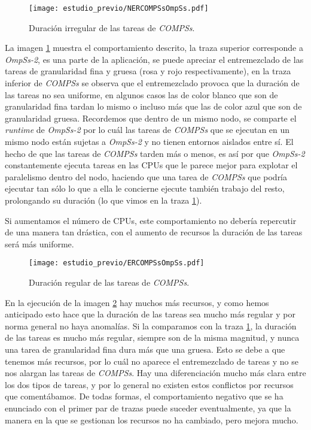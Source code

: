\begin{figure}[H]
	\centering 
	\caption{Duración irregular de las tareas de \textit{COMPSs}.}
	\texttt{[image: estudio\_previo/NERCOMPSsOmpSs.pdf]}
	\label{fig:irregular}
\end{figure}

La imagen \ref{fig:irregular} muestra el comportamiento descrito, la traza superior corresponde a \textit{OmpSs-2}, es una parte de la aplicación, se puede apreciar el entremezclado de las tareas de granularidad fina y gruesa (rosa y rojo respectivamente), en la traza inferior de \textit{COMPSs} se observa que el entremezclado provoca que la duración de las tareas no sea uniforme, en algunos casos las de color blanco que son de granularidad fina tardan lo mismo o incluso más que las de color azul que son de granularidad gruesa. Recordemos que dentro de un mismo nodo, se comparte el \textit{runtime} de \textit{OmpSs-2} por lo cuál las tareas de \textit{COMPSs} que se ejecutan en un mismo nodo están sujetas a \textit{OmpSs-2} y no tienen entornos aislados entre sí. El hecho de que las tareas de \textit{COMPSs} tarden más o menos, es así por que \textit{OmpSs-2} constantemente ejecuta tareas en las CPUs que le parece mejor para explotar el paralelismo dentro del nodo, haciendo que una tarea de \textit{COMPSs} que podría ejecutar tan sólo lo que a ella le concierne ejecute también trabajo del resto, prolongando su duración (lo que vimos en la traza \ref{fig:irregular}).

\par\bigskip

Si aumentamos el número de CPUs, este comportamiento no debería repercutir de una manera tan drástica, con el aumento de recursos la duración de las tareas será más uniforme.

\begin{figure}[H]
	\centering 
	\caption{Duración regular de las tareas de \textit{COMPSs}.}
	\texttt{[image: estudio\_previo/ERCOMPSsOmpSs.pdf]}
	\label{fig:regular}
\end{figure}

En la ejecución de la imagen \ref{fig:regular} hay muchos más recursos, y como hemos anticipado esto hace que la duración de las tareas sea mucho más regular y por norma general no haya anomalías. Si la comparamos con la traza \ref{fig:irregular}, la duración de las tareas es mucho más regular, siempre son de la misma magnitud, y nunca una tarea de granularidad fina dura más que una gruesa. Esto se debe a que tenemos más recursos, por lo cuál no aparece el entremezclado de tareas y no se nos alargan las tareas de \textit{COMPSs}. Hay una diferenciación mucho más clara entre los dos tipos de tareas, y por lo general no existen estos conflictos por recursos que comentábamos. De todas formas, el comportamiento negativo que se ha enunciado con el primer par de trazas puede suceder eventualmente, ya que la manera en la que se gestionan los recursos no ha cambiado, pero mejora mucho.

